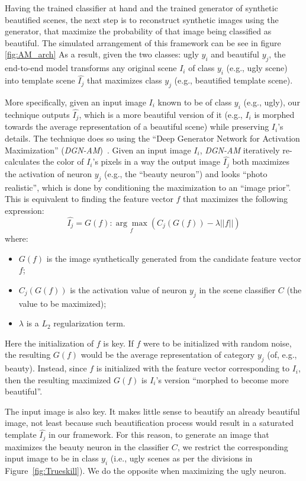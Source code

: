 Having the trained classifier at hand and the trained generator of synthetic beautified scenes, the next step is to reconstruct synthetic images using the generator, that maximize the probability of that image being classified as beautiful. The simulated arrangement of this framework can be see in figure \ref{fig:AM_arch} 
As a result, given the two classes: ugly $y_i$ and beautiful $y_j$, the end-to-end model  transforms any original scene $I_i$ of class $y_i$ (e.g., ugly scene) into template scene $\hat{I_j}$ that maximizes class $y_j$ (e.g., beautified template scene). 

More specifically, given an input image $I_i$ known to be of class $y_i$  (e.g., ugly), our technique outputs  $\hat{I_j}$, which is a more beautiful version of it (e.g., $I_i$ is morphed  towards the average representation of a beautiful scene) while preserving $I_i$'s details. The technique does so using the ``Deep Generator Network for Activation Maximization'' (\emph{DGN-AM})~\cite{nguyen2016synthesizing}. Given an input image $I_i$, \emph{DGN-AM} iteratively re-calculates the color of $I_i$'s pixels in  a way  the output image $\hat{I_j}$  both maximizes  the  activation of neuron $y_j$ (e.g., the ``beauty neuron'') and looks ``photo realistic'',  which is done by conditioning the maximization to an ``image prior''. This is equivalent to finding the feature vector $f$ that maximizes the following expression:
\begin{equation}
\hat{I_j} =G( f ) : \underset{f}{\arg\max}(C_{j}(G(f))-\lambda||f||)
\end{equation}
where:
\begin{itemize}
    \item $G(f)$ is the image synthetically generated from the candidate feature vector $f$;
    \item $C_j(G(f))$ is the activation value of neuron $y_j$ in the scene classifier $C$ (the value to be maximized);
    \item $\lambda$ is a $L_2$ regularization term.
\end{itemize}
Here the initialization of $f$ is key. If $f$ were to be initialized with random noise, the resulting $G(f)$ would be the average representation of category $y_j$ (of, e.g., beauty). Instead, since $f$ is initialized with the feature vector corresponding to $I_i$, then the resulting maximized $G(f)$ is $I_i$'s version ``morphed to become more beautiful''.

The input image is also key. It makes little sense to beautify an already beautiful image, not least because such beautification process would result in a saturated template $\hat{I_j}$ in our framework. For this reason, to generate an image that maximizes the beauty neuron in the classifier $C$, we restrict the  corresponding input image to be in class $y_i$ (i.e., ugly scenes as per the divisions in Figure~\ref{fig:Trueskill}). We do the opposite when maximizing the ugly neuron. 

